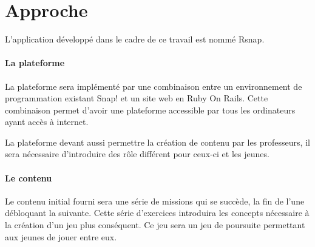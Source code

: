 \section{Approche}
\label{intro-approche}
L'application développé dans le cadre de ce travail est nommé Rsnap.

\paragraph{La plateforme} La plateforme sera implémenté par une combinaison entre un environnement de programmation existant Snap! et un site web en Ruby On Rails. Cette combinaison permet d'avoir une plateforme accessible par tous les ordinateurs ayant accès à internet.

La plateforme devant aussi permettre la création de contenu par les professeurs, il sera nécessaire d'introduire des rôle différent pour ceux-ci et les jeunes.

\paragraph{Le contenu} Le contenu initial fourni sera une série de missions qui se succède, la fin de l'une débloquant la suivante. Cette série d'exercices introduira les concepts nécessaire à la création d'un jeu plus conséquent. Ce jeu sera un jeu de poursuite permettant aux jeunes de jouer entre eux.